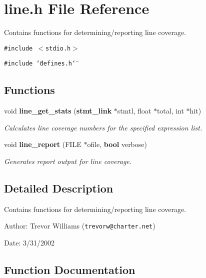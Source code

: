 \section{line.h File Reference}
\label{line_8h}
Contains functions for determining/reporting line coverage. 


{\tt \#include $<$stdio.h$>$}\par
{\tt \#include \char`\"{}defines.h\char`\"{}}\par
\subsection*{Functions}
\begin{CompactItemize}
\item 
void {\bf line\_\-get\_\-stats} ({\bf stmt\_\-link} $\ast$stmtl, float $\ast$total, int $\ast$hit)
\begin{CompactList}\small\item\em Calculates line coverage numbers for the specified expression list.\item\end{CompactList}\item 
void {\bf line\_\-report} (FILE $\ast$ofile, {\bf bool} verbose)
\begin{CompactList}\small\item\em Generates report output for line coverage.\item\end{CompactList}\end{CompactItemize}


\subsection{Detailed Description}
Contains functions for determining/reporting line coverage.

\begin{Desc}
\item[Author:]Trevor Williams ({\tt trevorw@charter.net}) \end{Desc}
\begin{Desc}
\item[Date:]3/31/2002 \end{Desc}


\subsection{Function Documentation}
